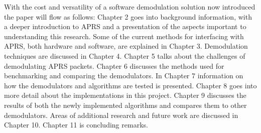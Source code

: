 With the cost and versatility of a software demodulation solution now introduced the paper will flow as follows: Chapter 2 goes into background information, with a deeper introduction to APRS and a presentation of the aspects important to understanding this research. Some of the current methods for interfacing with APRS, both hardware and software, are explained in Chapter 3. Demodulation techniques are discussed in Chapter 4. Chapter 5 talks about the challenges of demodulating APRS packets. Chapter 6 discusses the methods used for benchmarking and comparing the demodulators. In Chapter 7 information on how the demodulators and algorithms are tested is presented. Chapter 8 goes into more detail about the implementations in this project. Chapter 9 discusses the results of both the newly implemented algorithms and compares them to other demodulators. Areas of additional research and future work are discussed in Chapter 10. Chapter 11 is concluding remarks.
